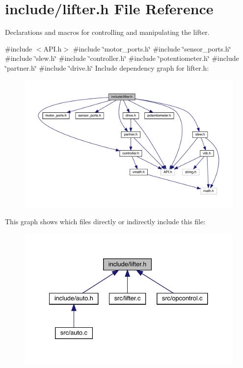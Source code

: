 \section{include/lifter.h File Reference}
\label{lifter_8h}


Declarations and macros for controlling and manipulating the lifter.  


{\ttfamily \#include $<$A\+P\+I.\+h$>$}\newline
{\ttfamily \#include \char`\"{}motor\+\_\+ports.\+h\char`\"{}}\newline
{\ttfamily \#include \char`\"{}sensor\+\_\+ports.\+h\char`\"{}}\newline
{\ttfamily \#include \char`\"{}slew.\+h\char`\"{}}\newline
{\ttfamily \#include \char`\"{}controller.\+h\char`\"{}}\newline
{\ttfamily \#include \char`\"{}potentiometer.\+h\char`\"{}}\newline
{\ttfamily \#include \char`\"{}partner.\+h\char`\"{}}\newline
{\ttfamily \#include \char`\"{}drive.\+h\char`\"{}}\newline
Include dependency graph for lifter.\+h\+:
\nopagebreak
\begin{figure}[H]
\begin{center}
\leavevmode
\includegraphics[width=350pt]{lifter_8h__incl}
\end{center}
\end{figure}
This graph shows which files directly or indirectly include this file\+:
\nopagebreak
\begin{figure}[H]
\begin{center}
\leavevmode
\includegraphics[width=334pt]{lifter_8h__dep__incl}
\end{center}
\end{figure}
